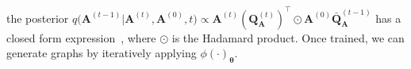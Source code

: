 the posterior $q\big(\mathbf{A}^{(t-1)}|\mathbf{A}^{(t)}, \mathbf{A}^{(0)}, t\big) \propto \mathbf{A}^{(t)}(\mathbf{Q}_{\mathbf{A}}^{(t)})^{\top} \odot \mathbf{A}^{(0)} \bar{\mathbf{Q}}_{\mathbf{A}}^{(t-1)}$
has a closed form expression~\cite{sohl2015deep, song2019generative, li2023graphmaker}, where $\odot$ is the Hadamard product.
Once trained, we can generate graphs by iteratively applying $\phi(\cdot)_{\boldsymbol{\theta}}$.








